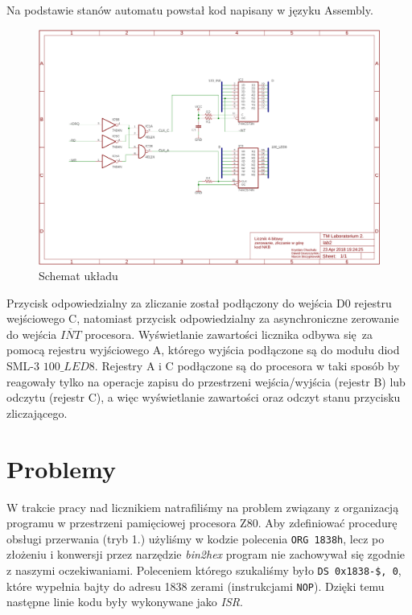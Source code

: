 \documentclass[fleqn]{article}
\begin{document}
Na podstawie stanów automatu powstał kod napisany w języku Assembly.

\noindent\begin{minipage}{.45\textwidth}
	
\end{minipage}\hfill
\noindent\begin{minipage}{.45\textwidth}
	
\end{minipage}\hfill

\begin{figure}[H]
	\centering
	\includegraphics[width=\textwidth]{img/schematic.pdf}
	\caption{Schemat układu}
	\label{fig:schematic}
\end{figure}


Przycisk odpowiedzialny za zliczanie został podłączony do wejścia D0 rejestru wejściowego C, natomiast przycisk odpowiedzialny za asynchroniczne zerowanie do wejścia $\overline{INT}$ procesora.
Wyświetlanie zawartości licznika odbywa się za pomocą rejestru wyjściowego A, którego wyjścia podłączone są do modułu diod SML-3 $\textit{100\_LED8}$. Rejestry A i C podłączone są do procesora w taki sposób by reagowały tylko na operacje zapisu do przestrzeni wejścia/wyjścia (rejestr B) lub odczytu (rejestr C), a więc wyświetlanie zawartości oraz odczyt stanu przycisku zliczającego.


\section{Problemy}
W trakcie pracy nad licznikiem natrafiliśmy na problem związany z organizacją programu w przestrzeni pamięciowej procesora Z80. Aby zdefiniować procedurę obsługi przerwania (tryb 1.) użyliśmy w kodzie polecenia \lstinline|ORG 1838h|, lecz po złożeniu i konwersji przez narzędzie \textit{bin2hex} program nie zachowywał się zgodnie z naszymi oczekiwaniami. Poleceniem którego szukaliśmy było \lstinline|DS 0x1838-$, 0|, które wypełnia bajty do adresu 1838 zerami (instrukcjami \lstinline|NOP|). Dzięki temu następne linie kodu były wykonywane jako \textit{ISR}.
\end{document}
